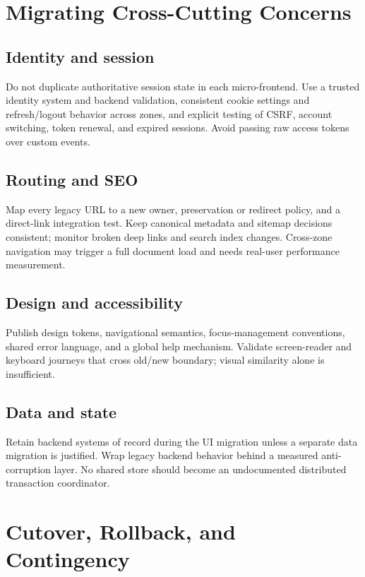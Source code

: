\documentclass[11pt,letterpaper,oneside]{report}
\begin{document}
\chapter{Migrating Cross-Cutting Concerns}
\section{Identity and session}
Do not duplicate authoritative session state in each micro-frontend. Use a trusted identity system and backend validation, consistent cookie settings and refresh/logout behavior across zones, and explicit testing of CSRF, account switching, token renewal, and expired sessions. Avoid passing raw access tokens over custom events.
\section{Routing and SEO}
Map every legacy URL to a new owner, preservation or redirect policy, and a direct-link integration test. Keep canonical metadata and sitemap decisions consistent; monitor broken deep links and search index changes. Cross-zone navigation may trigger a full document load and needs real-user performance measurement.
\section{Design and accessibility}
Publish design tokens, navigational semantics, focus-management conventions, shared error language, and a global help mechanism. Validate screen-reader and keyboard journeys that cross old/new boundary; visual similarity alone is insufficient.
\section{Data and state}
Retain backend systems of record during the UI migration unless a separate data migration is justified. Wrap legacy backend behavior behind a measured anti-corruption layer. No shared store should become an undocumented distributed transaction coordinator.
\chapter{Cutover, Rollback, and Contingency}
\end{document}

